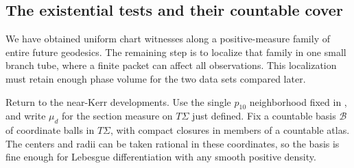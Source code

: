 \subsection{The existential tests and their countable cover}

We have obtained uniform chart witnesses along a positive-measure
family of entire future geodesics. The remaining step is to localize
that family in one small branch tube, where a finite packet can affect
all observations. This localization must retain enough phase volume
for the two data sets compared later.

Return to the near-Kerr developments.  Use the single
$p_{10}$ neighborhood fixed in , and
write $\mu_d$ for the section measure on $T\Sigma$ just
defined.  Fix a countable basis $\mathcal B$ of coordinate
balls in $T\Sigma$, with compact closures in members of a
countable atlas.  The centers and radii can be taken rational
in these coordinates, so the basis is fine enough for
Lebesgue differentiation with any smooth positive density.

